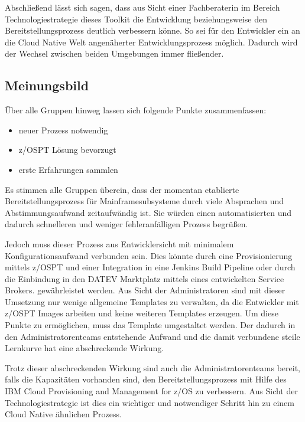 Abschließend lässt sich sagen, dass aus Sicht einer Fachberaterin im Bereich Technologiestrategie dieses Toolkit die Entwicklung beziehungsweise den Bereitstellungsprozess deutlich verbessern könne.
So sei für den Entwickler ein an die Cloud Native Welt angenäherter Entwicklungsprozess möglich.
Dadurch wird der Wechsel zwischen beiden Umgebungen immer fließender.

\subsection{Meinungsbild}
Über alle Gruppen hinweg lassen sich folgende Punkte zusammenfassen:

\begin{itemize}
\item neuer Prozess notwendig
\item z/OSPT Lösung bevorzugt
\item erste Erfahrungen sammlen
\end{itemize}

Es stimmen alle Gruppen überein, dass der momentan etablierte Bereitstellungsprozess für Mainframesubsysteme durch viele Absprachen und Abstimmungsaufwand zeitaufwändig ist.
Sie würden einen automatisierten und dadurch schnelleren und weniger fehleranfälligen Prozess begrüßen.

Jedoch muss dieser Prozess aus Entwicklersicht mit minimalem Konfigurationsaufwand verbunden sein.
Dies könnte durch eine Provisionierung mittels z/OSPT und einer  Integration in eine Jenkins Build Pipeline oder durch die Einbindung in den \glqq DATEV Marktplatz\grqq{} mittels eines entwickelten \glqq Service Brokers\grqq. gewährleistet werden.
Aus Sicht der Administratoren sind mit dieser Umsetzung nur wenige allgemeine Templates zu verwalten, da die Entwickler mit z/OSPT Images arbeiten und keine weiteren Templates erzeugen.
Um diese Punkte zu ermöglichen, muss das Template umgestaltet werden.
Der dadurch in den Administratorenteams entstehende Aufwand und die damit verbundene steile Lernkurve hat eine abschreckende Wirkung.

Trotz dieser abschreckenden Wirkung sind auch die Administratorenteams bereit, falls die Kapazitäten vorhanden sind, den Bereitstellungsprozess mit Hilfe des \glqq IBM Cloud Provisioning and Management for z/OS\grqq{} zu verbessern.
Aus Sicht der Technologiestrategie ist dies ein wichtiger und notwendiger Schritt hin zu einem Cloud Native ähnlichen Prozess.
